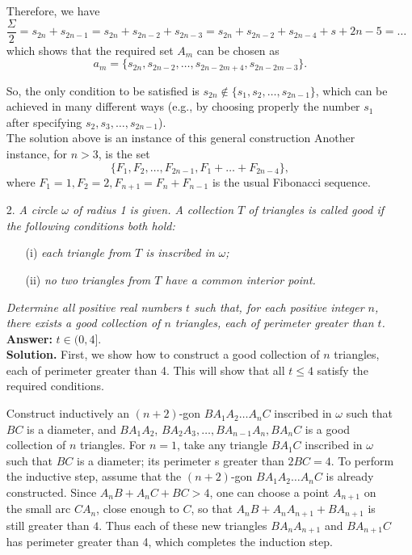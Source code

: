 \documentclass[a4paper, 12pt]{article}
\begin{document}
\begin{enumerate}
Therefore, we have
$$
\frac{\Sigma}{2} = s_{2n} + s_{2n-1} = s_{2n} + s_{2n-2} + s_{2n-3} = s_{2n} + s_{2n-2} + s_{2n-4} + s+{2n-5} = \dots
$$
which shows that the required set $A_m$ can be chosen as
$$
a_m = \{ s_{2n}, s_{2n-2}, \dots, s_{2n-2m+4}, s_{2n-2m-3} \}.
$$

So, the only condition to be satisfied is $s_{2n} \not \in \{s_1, s_2, \dots, s_{2n-1} \}$, which can be achieved in many different ways (e.g., by choosing properly the number $s_1$ after specifying $s_2, s_3, \dots, s_{2n-1}$). \\

The solution above is an instance of this general construction Another instance, for $n > 3$, is the set
$$
\{ F_1, F_2, \dots, F_{2n-1}, F_1 + \dots + F_{2n-4} \},
$$
where $F_1 = 1, F_2 = 2, F_{n+1} = F_n + F_{n-1}$ is the usual Fibonacci sequence.



\vspace{5mm}
\item[2.]  \textit{A circle $\omega$ of radius 1 is given. A collection $T$ of triangles is called \emph{good} if the following conditions both hold:}
\begin{enumerate}
  \item[(i)]  \textit{each triangle from $T$ is inscribed in $\omega$;}
  \item[(ii)]  \textit{no two triangles from $T$ have a common interior point.} 
\end{enumerate}

\textit{Determine all positive real numbers $t$ such that, for each positive integer $n$, there exists a good collection of $n$ triangles, each of perimeter greater than $t$.} \\


\textbf{Answer:} $t \in (0, 4].$ \\

\textbf{Solution.}  First, we show how to construct a good collection of $n$ triangles, each of perimeter greater than 4. This will show that all $t \leq 4$ satisfy the required conditions.

Construct inductively an $(n+2)$-gon $BA_1 A_2 \dots A_n C$ inscribed in $\omega$ such that $BC$ is a diameter, and $B A_1 A_2$, $BA_2 A_3, \dots, BA_{n-1} A_n, BA_n C$ is a good collection of $n$ triangles. For $n=1$, take any triangle $B A_1 C$ inscribed in $\omega$ such that $BC$ is a diameter; its perimeter s greater than $2 BC = 4$. To perform the inductive step, assume that the $(n+2)$-gon $B A_1 A_2 \dots A_n C$ is already constructed. Since $A_n B + A_n C+ BC > 4$, one can choose a point $A_{n+1}$ on the small arc $C A_n$, close enough to $C$, so that $A_n B + A_n A_{n+1} + B A_{n+1}$ is still greater than $4$. Thus each of these new triangles $B A_n A_{n+1}$ and $B A_{n+1} C$ has perimeter greater than 4, which completes the induction step.



\end{enumerate}
\end{document}
